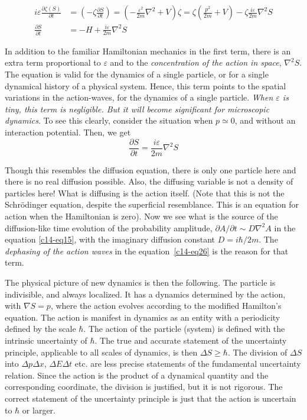 {\fontsize{9}{9}\selectfont\begin{align*}
i \varepsilon \frac{\partial \zeta (S)}{\partial t} & = \left(-\zeta \frac{\partial S}{\partial t} \right) = \left(-\frac{\varepsilon^2}{2m} \nabla^2 + V \right) \zeta = \zeta \left(\frac{p^2}{2m}  + V\right) - \zeta \frac{i\varepsilon}{2m} \nabla^2 S \tag{24}\label{c14-eq24}\\
\frac{\partial S}{\partial t} & = - H + \frac{i \varepsilon}{2m} \nabla^2 S\tag{25}\label{c14-eq25} 
\end{align*}}

In addition to the familiar Hamiltonian mechanics in the first term, there is an extra
term proportional to $\varepsilon$ and to the \textit{concentration of the action in space}, $\nabla^2 S$. The equation
is valid for the dynamics of a single particle, or for a single dynamical history of a physical system. Hence, this term points to the spatial
variations in the action-waves, for the dynamics of a single particle. \textit{When $\varepsilon$ is
tiny, this term is negligible. But it will become significant for microscopic dynamics}. To see
this clearly, consider the situation when $p \simeq 0$, and without an interaction potential. Then, we get
\begin{equation*}
\frac{\partial S}{\partial t} = \frac{i\varepsilon}{2m} \nabla^2 S \tag{26}\label{c14-eq26}
\end{equation*}

Though this resembles the diffusion equation, there is only one particle here and there is no
real diffusion possible. Also, the diffusing variable is not a density of particles here! What
is diffusing is the action itself. (Note that this is not the Schr\"{o}dinger equation, despite
the superficial resemblance. This is an equation for action when the Hamiltonian is zero). Now we see what
is the source of the diffusion-like time evolution of the probability amplitude,
$\partial A/\partial t\sim D \nabla^2 A$ in the equation \ref{c14-eq15}, with the imaginary diffusion constant $D = i \hbar /2m$. 
The \textit{dephasing of the action waves} in the equation~\ref{c14-eq26} is the reason for that term.

The physical picture of new dynamics is then the following. The particle is indivisible,
and always localized. It has a dynamics determined by the action, with $\nabla S = p$, where
the action evolves according to the modified Hamilton's equation. The action is manifest in
dynamics as an entity with a periodicity defined by the scale $\hbar$. The action of the particle
(system) is defined with the intrinsic uncertainty of $\hbar$. The true and accurate statement of
the uncertainty principle, applicable to all scales of dynamics, is then $\Delta S  \geq \hbar$. The division
of $\Delta S$ into $\Delta p \Delta x$, $\Delta E \Delta t$ etc. are less precise statements of the fundamental uncertainty relation.
Since the action is the product of a dynamical quantity and the corresponding coordinate,
the division is justified, but it is not rigorous. The correct statement of the uncertainty
principle is just that the action is uncertain to $\hbar$ or larger.

